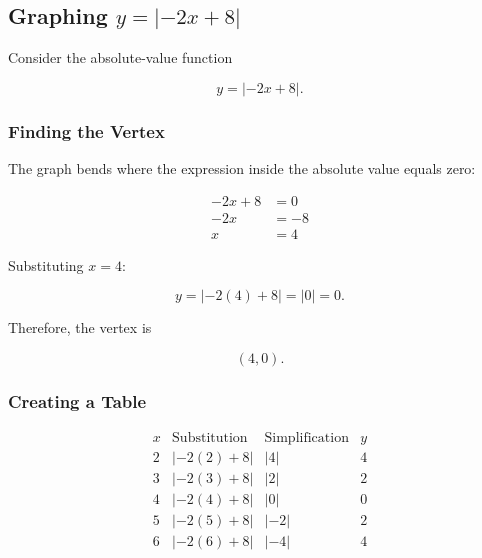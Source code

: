 \subsection{Graphing \(y = |-2x+8|\)}

Consider the absolute-value function

\[
y = |-2x+8|.
\]

\subsubsection{Finding the Vertex}

The graph bends where the expression inside the
absolute value equals zero:

\[
\begin{aligned}
-2x+8 &= 0 \\
-2x &= -8 \\
x &= 4
\end{aligned}
\]

Substituting \(x=4\):

\[
y = |-2(4)+8| = |0| = 0.
\]

Therefore, the vertex is

\[
\boxed{(4,0)}.
\]

\subsubsection{Creating a Table}

\[
\begin{array}{c|c|c|c}
x & \text{Substitution} & \text{Simplification} & y \\ \hline
2 & |-2(2)+8| & |4| & 4 \\
3 & |-2(3)+8| & |2| & 2 \\
4 & |-2(4)+8| & |0| & 0 \\
5 & |-2(5)+8| & |-2| & 2 \\
6 & |-2(6)+8| & |-4| & 4
\end{array}
\]
